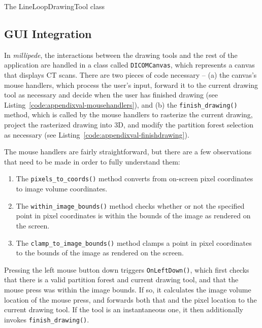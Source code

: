 \begin{stulisting}[p]
\caption{The LineLoopDrawingTool class}
\label{code:appendixval-lineloopdrawingtool}

\end{stulisting}


\newpage

\subsection{GUI Integration}
\label{subsec:appendixval-integration}


In \emph{millipede}, the interactions between the drawing tools and the rest of the application are handled in a class called \texttt{DICOMCanvas}, which represents a canvas that displays CT scans. There are two pieces of code necessary -- (a) the canvas's mouse handlers, which process the user's input, forward it to the current drawing tool as necessary and decide when the user has finished drawing (see Listing~\ref{code:appendixval-mousehandlers}), and (b) the \texttt{finish_drawing()} method, which is called by the mouse handlers to rasterize the current drawing, project the rasterized drawing into 3D, and modify the partition forest selection as necessary (see Listing~\ref{code:appendixval-finishdrawing}).

The mouse handlers are fairly straightforward, but there are a few observations that need to be made in order to fully understand them:
%
\begin{enumerate}

\item The \texttt{pixels_to_coords()} method converts from on-screen pixel coordinates to image volume coordinates.
\item The \texttt{within_image_bounds()} method checks whether or not the specified point in pixel coordinates is within the bounds of the image as rendered on the screen.
\item The \texttt{clamp_to_image_bounds()} method clamps a point in pixel coordinates to the bounds of the image as rendered on the screen.

\end{enumerate}
%
Pressing the left mouse button down triggers \texttt{OnLeftDown()}, which first checks that there is a valid partition forest and current drawing tool, and that the mouse press was within the image bounds. If so, it calculates the image volume location of the mouse press, and forwards both that and the pixel location to the current drawing tool. If the tool is an instantaneous one, it then additionally invokes \texttt{finish_drawing()}.

